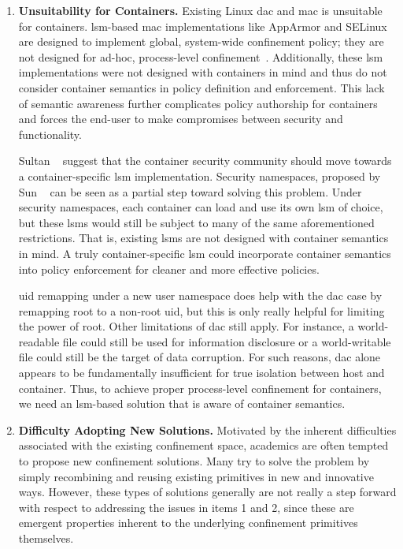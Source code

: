 \begin{enumerate}[font=\bfseries]
  \item \textbf{Unsuitability for Containers.}
    Existing Linux \gls{dac} and \gls{mac} is unsuitable for containers.
    \gls{lsm}-based \gls{mac} implementations like AppArmor and SELinux are
    designed to implement global, system-wide confinement policy; they are not designed
    for ad-hoc, process-level confinement~\cite{belair2019_leveraging}. Additionally,
    these \gls{lsm} implementations were not designed with containers in mind and thus
    do not consider container semantics in policy definition and enforcement. This lack
    of semantic awareness further complicates policy authorship for containers and
    forces the end-user to make compromises between security and functionality.

    Sultan \etal~\cite{sultan2019_container_security} suggest that the container
    security community should move towards a container-specific \gls{lsm}
    implementation. Security namespaces, proposed by Sun
    \etal~\cite{sun2018_security_namespace} can be seen as a partial step toward solving
    this problem.  Under security namespaces, each container can load and use its own
    \gls{lsm} of choice, but these \glspl{lsm} would still be subject to many of the
    same aforementioned restrictions. That is, existing \glspl{lsm} are not designed
    with container semantics in mind. A truly container-specific \gls{lsm} could incorporate
    container semantics into policy enforcement for cleaner and more effective policies.

    \gls{uid} remapping under a new user namespace does help with the \gls{dac} case by
    remapping root to a non-root \gls{uid}, but this is only really helpful for limiting
    the power of root. Other limitations of \gls{dac} still apply. For instance,
    a world-readable file could still be used for information disclosure or
    a world-writable file could still be the target of data corruption. For such reasons,
    \gls{dac} alone appears to be fundamentally insufficient for true isolation between
    host and container. Thus, to achieve proper process-level confinement for containers,
    we need an \gls{lsm}-based solution that is aware of container semantics.

  \item \textbf{Difficulty Adopting New Solutions.}
    Motivated by the inherent difficulties associated with the existing confinement space,
    academics are often tempted to propose new confinement solutions. Many try to solve
    the problem by simply recombining and reusing existing primitives in new and
    innovative ways.  However, these types of solutions generally are not really a step
    forward with respect to addressing the issues in items 1 and 2, since these are
    emergent properties inherent to the underlying confinement primitives themselves.


\end{enumerate}
